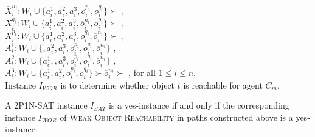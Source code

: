 \noindent
$\overline{X}_i^{n_i}:W_i\cup\{ a_i^1,a_i^2,a_i^3,o_i^{p_i},o_i^{q_i}\}\succ$ ,\\
$X_i^{q_i}:W_i\cup\{ a_i^1,a_i^2,a_i^3,\overline{o}_i^{n_i},o_i^{p_i}\}\succ$ ,\\
$X_i^{p_i}:W_i\cup\{ a_i^1,a_i^2,a_i^3,o_i^{q_i},\overline{o}_i^{n_i}\}\succ$ ,\\
$A_i^1:W_i\cup\{$$,a_i^2,a_i^3,o_i^{p_i},o_i^{q_i},\overline{o}_i^{n_i}\}$ ,\\
$A_i^2:W_i\cup\{ a_i^1,$$,a_i^3,o_i^{p_i},o_i^{q_i},\overline{o}_i^{n_i}\}$ ,\\
$A_i^3:W_i\cup\{ a_i^1,a_i^2,o_i^{p_i},o_i^{q_i}\}\succ\overline{o}_i^{n_i}\succ$ , for all $1\leq i\leq n$.\\

Instance $I_{WOR}$ is to determine whether object $t$ is reachable for agent $C_m$.



\begin{lemma}
    \label{lem_2p1n}
A \textsc{2P1N-SAT} instance $I_{SAT}$ is a yes-instance if and only if the corresponding instance $I_{WOR}$ of \textsc{Weak Object Reachability} in paths constructed above is a yes-instance.
\end{lemma}

